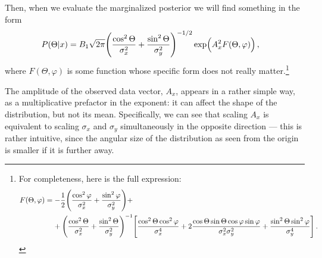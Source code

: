 \documentclass[main.tex]{subfiles}
\begin{document}
Then, when we  evaluate the marginalized posterior we will find something in the form
%
\begin{align}
P(\Theta | x) &= B_1 \sqrt{2 \pi } \qty( \frac{\cos^2\Theta }{\sigma_x^2} + \frac{\sin^2 \Theta }{\sigma _y^2})^{-1/2}
\exp( A_x^2 F(\Theta , \varphi ))
\,,
\end{align}
%
where \(F (\Theta , \varphi )\) is some function whose specific form does not really matter.\footnote{For completeness, here is the full expression: 
%
\begin{align}
\begin{split}
F(\Theta , \varphi ) &=
- \frac{1}{2} \qty( \frac{\cos^2\varphi}{\sigma^2_x} + \frac{\sin^2\varphi}{\sigma^2_y})+  \\
&\phantom{=}\ 
+ 
\qty( \frac{\cos^2 \Theta}{\sigma _x^2} + \frac{\sin^2 \Theta }{\sigma _y^2})^{-1}
\qty[ 
    \frac{\cos^2 \Theta \cos^2 \varphi }{\sigma _x^{4}}
    +2\frac{\cos \Theta \sin \Theta \cos \varphi \sin \varphi  }{\sigma _x^{2} \sigma _y^{2}}
    +\frac{\sin^2 \Theta \sin^2 \varphi }{\sigma _y^{4}}
]
\,.
\end{split}
\end{align}
%
}

The amplitude of the observed data vector, \(A_x\), appears in a rather simple way, as a multiplicative prefactor in the exponent: it can affect the shape of the distribution, but not its mean.
Specifically, we can see that scaling \(A_x\) is equivalent to scaling \(\sigma _x\) and \(\sigma _y\) simultaneously in the opposite direction --- this is rather intuitive, since the angular size of the distribution as seen from the origin is smaller if it is further away. 

\end{document}
